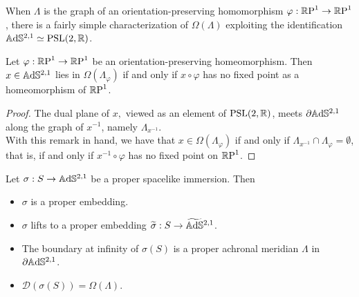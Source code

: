 When $\Lambda$ is the graph of an orientation-preserving homomorphism $\varphi:\S\to\S$, there is a fairly simple characterization of $\Omega(\Lambda)$ exploiting the identification $\A^{2,1}\simeq \PSL$.


\begin{corollary}\label{454}
    Let $\varphi:\S\to\S$ be an orientation-preserving homeomorphism. Then $x\in\A^{2,1}$ lies in $\Omega(\Lambda_\varphi)$ if and only if $x\circ\varphi$ has no fixed point as a homeomorphism of $\S$.
\end{corollary}
\begin{proof}
    The dual plane of $x,$ viewed as an element of $\PSL$, meets $\partial\A^{2,1}$ along the graph of $x^{-1}$, namely $\Lambda_{x^{-1}}$.\\
    With this remark in hand, we have that $x\in\Omega(\Lambda_\varphi)$ if and only if $\Lambda_{x^{-1}}\cap \Lambda_\varphi=\emptyset$, that is, if and only if $x^{-1}\circ\varphi$ has no fixed point on $\S$.

\end{proof}

\begin{proposition}\label{455}
    Let $\sigma: S\to\A^{2,1}$ be a proper spacelike immersion. Then 
    \begin{itemize}
        \item $\sigma$ is a proper embedding.
        \item $\sigma$ lifts to a proper embedding $\widetilde{\sigma}:S\to\AS^{2,1}$.
        \item The boundary at infinity of $\sigma(S)$ is a proper achronal meridian $\Lambda$ in $\partial\A^{2,1}$.
        \item $\mathcal{D}(\sigma(S))=\Omega(\Lambda).$
    \end{itemize}
\end{proposition}

